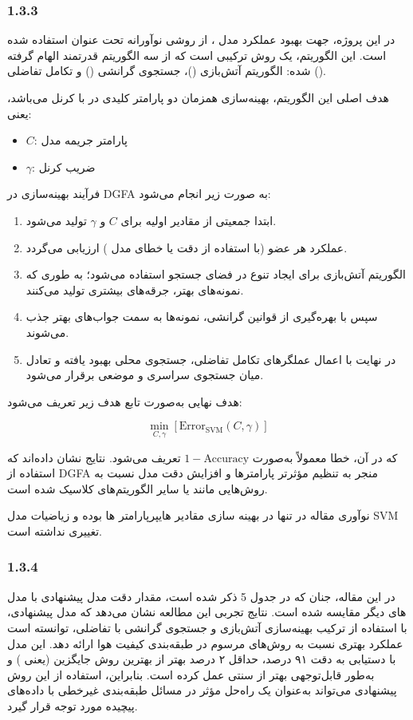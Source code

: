 \documentclass{article}
\begin{document}
\subsubsection{1.3.3}
در این پروژه، جهت بهبود عملکرد مدل ، از روشی نوآورانه تحت عنوان  استفاده شده است. این الگوریتم، یک روش  ترکیبی است که از سه الگوریتم قدرتمند الهام گرفته شده: الگوریتم آتش‌بازی ()، جستجوی گرانشی () و تکامل تفاضلی ().

هدف اصلی این الگوریتم، بهینه‌سازی همزمان دو پارامتر کلیدی در  با کرنل  می‌باشد، یعنی:
\begin{itemize}
	\item $C$: پارامتر جریمه مدل
	\item $\gamma$: ضریب کرنل
\end{itemize}

فرآیند بهینه‌سازی در DGFA به صورت زیر انجام می‌شود:
\begin{enumerate}
	\item ابتدا جمعیتی از مقادیر اولیه برای $C$ و $\gamma$ تولید می‌شود.
	\item عملکرد هر عضو (با استفاده از دقت یا خطای مدل ) ارزیابی می‌گردد.
	\item الگوریتم آتش‌بازی برای ایجاد تنوع در فضای جستجو استفاده می‌شود؛ به طوری که نمونه‌های بهتر، جرقه‌های بیشتری تولید می‌کنند.
	\item سپس با بهره‌گیری از قوانین گرانشی، نمونه‌ها به سمت جواب‌های بهتر جذب می‌شوند.
	\item در نهایت با اعمال عملگرهای تکامل تفاضلی، جستجوی محلی بهبود یافته و تعادل میان جستجوی سراسری و موضعی برقرار می‌شود.
\end{enumerate}

هدف نهایی به‌صورت تابع هدف زیر تعریف می‌شود:

\[
\min_{C, \gamma} \left[ \text{Error}_{\text{SVM}}(C, \gamma) \right]
\]

که در آن، خطا معمولاً به‌صورت $1 - \text{Accuracy}$ تعریف می‌شود. نتایج نشان داده‌اند که استفاده از DGFA منجر به تنظیم مؤثرتر پارامترها و افزایش دقت مدل نسبت به روش‌هایی مانند  یا سایر الگوریتم‌های کلاسیک شده است.

نوآوری مقاله در تنها در بهینه سازی مقادیر هایپرپارامتر ها بوده و زیاضیات مدل SVM تغییری نداشته است.

\subsubsection{1.3.4}
در این مقاله، جنان که در جدول 5 ذکر شده است، مقدار دقت مدل پیشنهادی با مدل های دیگر مقایسه شده است.
نتایج تجربی این مطالعه نشان می‌دهد که مدل  پیشنهادی، با استفاده از ترکیب بهینه‌سازی آتش‌بازی و جستجوی گرانشی با تفاضلی، توانسته است عملکرد بهتری نسبت به روش‌های مرسوم در طبقه‌بندی کیفیت هوا ارائه دهد. این مدل با دستیابی به دقت ۹۱ درصد، حداقل ۲ درصد بهتر از بهترین روش جایگزین (یعنی ) و به‌طور قابل‌توجهی بهتر از  سنتی عمل کرده است. بنابراین، استفاده از این روش پیشنهادی می‌تواند به‌عنوان یک راه‌حل مؤثر در مسائل طبقه‌بندی غیرخطی با داده‌های پیچیده مورد توجه قرار گیرد.
\end{document}
